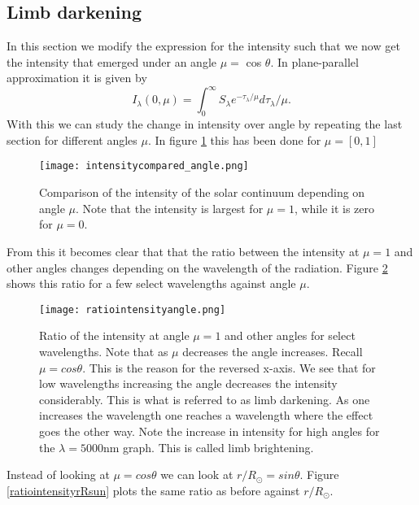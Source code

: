 \documentclass{aa}   %
\begin{document}
\subsection{Limb darkening}
In this section we modify the expression for the intensity such that we now get the intensity that emerged under an angle $\mu =$ cos $\theta$. In plane-parallel approximation it is given by
\begin{equation}
 I_\lambda(0,\mu) = \int_0^\infty S_\lambda e^{-\tau_\lambda/\mu}d\tau_\lambda/\mu.
\end{equation}
With this we can study the change in intensity over angle by repeating the last section for different angles $\mu$.
In figure \ref{intensitycompared_angle} this has been done for $\mu = [0,1]$

\begin{figure}
 \texttt{[image: intensitycompared\_angle.png]}
 \caption{Comparison of the intensity of the solar continuum depending on angle $\mu$. Note that the intensity is largest for $\mu = 1$, while it is zero for $\mu = 0$.}
\label{intensitycompared_angle}
\end{figure}
From this it becomes clear that that the ratio between the intensity at $\mu = 1$ and other angles changes depending on the wavelength of the radiation. Figure \ref{ratiointensityangle} shows this ratio for a few select wavelengths against angle $\mu$. 

\begin{figure}
 \texttt{[image: ratiointensityangle.png]}
 \caption{Ratio of the intensity at angle $\mu=1$ and other angles for select wavelengths. Note that as $\mu$ decreases the angle increases. Recall $\mu = cos\theta$. This is the reason for the reversed x-axis. We see that for low wavelengths increasing the angle decreases the intensity considerably. This is what is referred to as limb darkening. As one increases the wavelength one reaches a wavelength where the effect goes the other way. Note the increase in intensity for high angles for the $\lambda = 5000$nm graph. This is called limb brightening.}
\label{ratiointensityangle}
\end{figure}

Instead of looking at $\mu = cos \theta$ we can look at $r/R_\odot = sin \theta$. Figure \ref{ratiointensityrRsun} plots the same ratio as before against $r/R_\odot$. 
\end{document}
